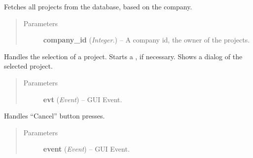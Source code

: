 \documentclass[letterpaper,10pt,english]{sphinxmanual}
\begin{document}
\begin{fulllineitems}
\begin{fulllineitems}
\begin{quote}
\begin{description}
\end{description}\end{quote}

\end{fulllineitems}


\begin{fulllineitems}
\label{api:wos.ProjectSelectDialog.GetProjects}
Fetches all projects from the database, based on the company.
\begin{quote}\begin{description}
\item[{Parameters}] \leavevmode
\textbf{company\_id} (\emph{Integer.}) -- A company id, the owner of the projects.

\end{description}\end{quote}

\end{fulllineitems}


\begin{fulllineitems}
\label{api:wos.ProjectSelectDialog.SelEvent}
Handles the selection of a project.
Starts a {\hyperref[api:wos.CURRENT_PROJECT]{}}, if necessary.
Shows a dialog of the selected project.
\begin{quote}\begin{description}
\item[{Parameters}] \leavevmode
\textbf{evt} (\emph{Event}) -- GUI Event.

\end{description}\end{quote}

\end{fulllineitems}


\begin{fulllineitems}
\label{api:wos.ProjectSelectDialog.onCancel}
Handles ``Cancel'' button presses.
\begin{quote}\begin{description}
\item[{Parameters}] \leavevmode
\textbf{event} (\emph{Event}) -- GUI Event.

\end{description}\end{quote}

\end{fulllineitems}


\end{fulllineitems}
\end{document}
